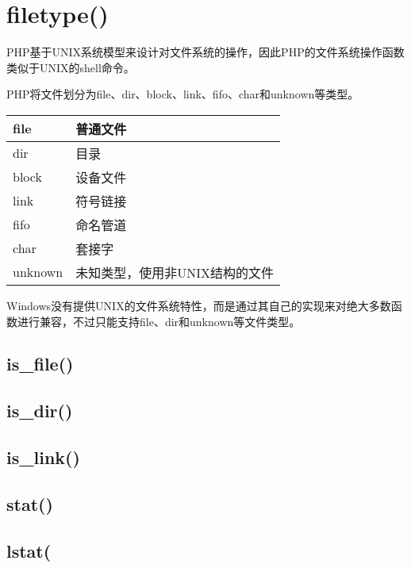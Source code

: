 \section{filetype()}

PHP基于UNIX系统模型来设计对文件系统的操作，因此PHP的文件系统操作函数类似于UNIX的shell命令。




PHP将文件划分为file、dir、block、link、fifo、char和unknown等类型。

\begin{table}
\centering
\begin{tabular}{|l|l|}
\hline
file & 普通文件\\
\hline
dir & 目录\\
\hline
block & 设备文件\\
\hline
link & 符号链接\\
\hline
fifo & 命名管道\\
\hline
char & 套接字\\
\hline
unknown & 未知类型，使用非UNIX结构的文件\\
\hline
\end{tabular}
\end{table}


Windows没有提供UNIX的文件系统特性，而是通过其自己的实现来对绝大多数函数进行兼容，不过只能支持file、dir和unknown等文件类型。


\subsection{is\_file()}



\subsection{is\_dir()}



\subsection{is\_link()}


\subsection{stat()}


\subsection{lstat(}


